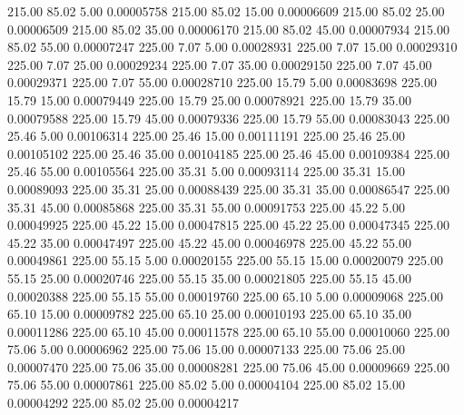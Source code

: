     215.00     85.02      5.00     0.00005758
    215.00     85.02     15.00     0.00006609
    215.00     85.02     25.00     0.00006509
    215.00     85.02     35.00     0.00006170
    215.00     85.02     45.00     0.00007934
    215.00     85.02     55.00     0.00007247
    225.00      7.07      5.00     0.00028931
    225.00      7.07     15.00     0.00029310
    225.00      7.07     25.00     0.00029234
    225.00      7.07     35.00     0.00029150
    225.00      7.07     45.00     0.00029371
    225.00      7.07     55.00     0.00028710
    225.00     15.79      5.00     0.00083698
    225.00     15.79     15.00     0.00079449
    225.00     15.79     25.00     0.00078921
    225.00     15.79     35.00     0.00079588
    225.00     15.79     45.00     0.00079336
    225.00     15.79     55.00     0.00083043
    225.00     25.46      5.00     0.00106314
    225.00     25.46     15.00     0.00111191
    225.00     25.46     25.00     0.00105102
    225.00     25.46     35.00     0.00104185
    225.00     25.46     45.00     0.00109384
    225.00     25.46     55.00     0.00105564
    225.00     35.31      5.00     0.00093114
    225.00     35.31     15.00     0.00089093
    225.00     35.31     25.00     0.00088439
    225.00     35.31     35.00     0.00086547
    225.00     35.31     45.00     0.00085868
    225.00     35.31     55.00     0.00091753
    225.00     45.22      5.00     0.00049925
    225.00     45.22     15.00     0.00047815
    225.00     45.22     25.00     0.00047345
    225.00     45.22     35.00     0.00047497
    225.00     45.22     45.00     0.00046978
    225.00     45.22     55.00     0.00049861
    225.00     55.15      5.00     0.00020155
    225.00     55.15     15.00     0.00020079
    225.00     55.15     25.00     0.00020746
    225.00     55.15     35.00     0.00021805
    225.00     55.15     45.00     0.00020388
    225.00     55.15     55.00     0.00019760
    225.00     65.10      5.00     0.00009068
    225.00     65.10     15.00     0.00009782
    225.00     65.10     25.00     0.00010193
    225.00     65.10     35.00     0.00011286
    225.00     65.10     45.00     0.00011578
    225.00     65.10     55.00     0.00010060
    225.00     75.06      5.00     0.00006962
    225.00     75.06     15.00     0.00007133
    225.00     75.06     25.00     0.00007470
    225.00     75.06     35.00     0.00008281
    225.00     75.06     45.00     0.00009669
    225.00     75.06     55.00     0.00007861
    225.00     85.02      5.00     0.00004104
    225.00     85.02     15.00     0.00004292
    225.00     85.02     25.00     0.00004217
